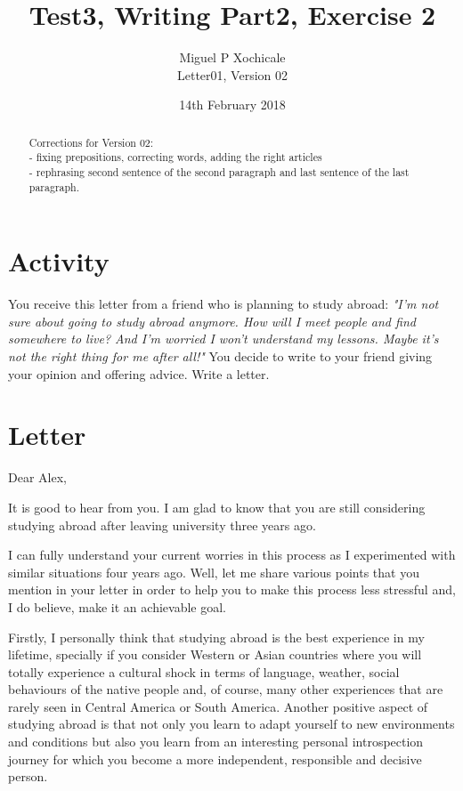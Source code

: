\documentclass[10pt]{article}
\title{Test3, Writing Part2, Exercise 2}
\author{Miguel P Xochicale \\
Letter01, Version 02}
\date{14th February 2018}
\begin{document}
\maketitle
\thispagestyle{empty} %


\begin{abstract}
Corrections for Version 02: \\
- fixing prepositions, correcting words, adding the right articles\\
- rephrasing second sentence of the second paragraph and last sentence of the last paragraph.
\end{abstract}


\section{Activity}
You receive this letter from a friend who is planning to study abroad:
\textit{
"I'm not sure about going to study abroad anymore. How will I meet people
and find somewhere to live? And I'm worried I won't understand my lessons.
Maybe it's not the right thing for me after all!"}
You decide to write to your friend giving your opinion and offering advice.
Write a letter. 

\section{Letter}


Dear Alex,

It is good to hear from you. I am glad to know that you are still considering
studying abroad after leaving university three years ago.

I can fully understand your current worries in this process as 
I experimented with similar situations four years ago. Well, let me share
various points that you mention in your letter in order to help you to make 
this process less stressful and, I do believe, make it an achievable goal.

Firstly, I personally think that studying abroad is the best experience in my 
lifetime, specially if you consider Western or Asian countries where 
you will totally experience a cultural shock in terms of language, weather, 
social behaviours of the native people and, of course, many other experiences 
that are rarely seen in Central America or South America. 
Another positive aspect of studying abroad is that not only 
you learn to adapt yourself to new environments and conditions 
but also you learn from an interesting personal introspection journey
for which you become a more independent, responsible and decisive person.
\end{document}

